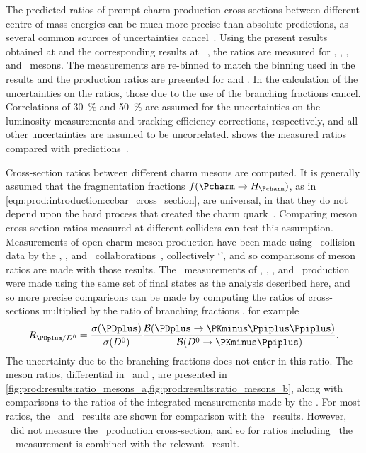 The predicted ratios of prompt charm production cross-sections between
different centre-of-mass energies can be much more precise than absolute
predictions, as several common sources of uncertainties
cancel~\cite{Gauld:2015yia,Cacciari:2015fta,Kniehl:2012ti}.
Using the present results obtained at  and the corresponding
results at ~\cite{LHCb-PAPER-2012-041}, the ratios
 are measured for \PDzero, \PDplus, \PDsplus, and \PDstarp\
mesons.
The  measurements are re-binned to match the binning used in the
\sqrtseq{7} results and the production ratios are presented for 
and \yrange{2}{4.5}.
In the calculation of the uncertainties on the ratios, those due to the use of
the branching fractions cancel.
Correlations of \SI{30}{\percent} and \SI{50}{\percent} are assumed for the
uncertainties on the luminosity measurements and tracking efficiency
corrections, respectively, and all other uncertainties are assumed to be
uncorrelated.
 shows the measured ratios compared with
predictions~\cite{Gauld:2015yia,Cacciari:2015fta,Kniehl:2012ti}.

Cross-section ratios between different charm mesons are computed.
It is generally assumed that the fragmentation fractions $f(\cToHc)$, as in
\cref{eqn:prod:introduction:ccbar_cross_section}, are universal, in that they
do not depend upon the hard process that created the charm
quark~\cite{PDG2008,Lisovyi:2015uqa}.
Comparing meson cross-section ratios measured at different colliders can test
this assumption.
Measurements of open charm meson production have been made using \epem\
collision data by the \babar, \belle, and \cleo\
collaborations~\cite{Artuso:2004pj,Seuster:2005tr,Aubert:2002ue}, collectively
`\bfactories', and so comparisons of meson ratios are made with those results.
The \bfactory\ measurements of \PDzero, \PDplus, \PDsplus, and \PDstarp\
production were made using the same set of final states as the analysis
described here, and so more precise comparisons can be made by computing the
ratios of cross-sections multiplied by the ratio of branching fractions
\xsectimesbfrac, for example
\begin{equation*}
  \resultratio{\PDplus}{\PDzero} = \frac{%
    \xsec(\PDplus)
  }{%
    \xsec(\PDzero)
  }\frac{%
    \bfrac(\DpToKpipi)
  }{%
    \bfrac(\DzToKpi)
  }.
\end{equation*}
The uncertainty due to the branching fractions does not enter in this ratio.
The meson ratios, differential in \pT\ and \rapidity, are presented in
\cref{fig:prod:results:ratio_mesons_a,fig:prod:results:ratio_mesons_b}, along
with comparisons to the ratios of the integrated measurements made by the
\bfactories.
For most ratios, the \belle\ and \cleo\ results are shown for comparison with
the \lhcb\ results.
However, \cleo\ did not measure the \PDsplus\ production cross-section, and so
for ratios including \PDsplus\ the \babar\ \PDsplus\ measurement is combined 
with the relevant \cleo\ result.

